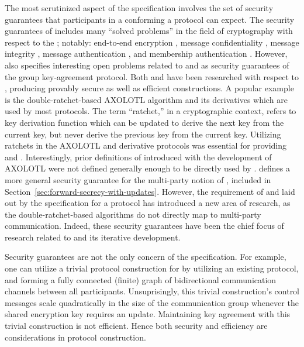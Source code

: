 The most scrutinized aspect of the  specification involves the set of security guarantees that participants in a conforming a protocol can expect.
The security guarantees of  includes many ``solved problems'' in the field of cryptography with respect to the ; notably: end-to-end encryption \autocite{padlipsky1978limitations}, message confidentiality \autocite{17715}, message integrity \autocite{voydock1983security}, message authentication \autocite{jueneman1983message}, and membership authentication \autocite{chaum1985showing}.
However,  also specifies interesting open problems related to  \autocite{gunther1989identity} and  \autocite{cohn2016post} as security guarantees of the group key-agreement protocol.
Both  and  have been researched with respect to , producing provably secure as well as efficient constructions.
A popular example is the double-ratchet-based AXOLOTL algorithm \autocite{perrin2014axolotl} and its derivatives which are used by most  protocols.
The term ``ratchet,'' in a cryptographic context, refers to key derivation function which can be updated to derive the next key from the current key, but never derive the previous key from the current key.
Utilizing ratchets in the AXOLOTL and derivative protocols was essential for providing  and .
Interestingly, prior definitions of  introduced with the development of AXOLOTL were not defined generally enough to be directly used by .
 defines a more general security guarantee for the multi-party notion of , included in Section\ \ref{sec:forward-secrecy-with-updates}.
However, the requirement of  and  laid out by the  specification for a  protocol has introduced a new area of research, as the double-ratchet-based algorithms do not directly map to multi-party communication.
Indeed, these  security guarantees have been the chief focus of research related to  and its iterative development.

Security guarantees are not the only concern of the  specification.
For example, one can utilize a trivial protocol construction for  by utilizing an existing  protocol, and forming a fully connected (finite) graph of bidirectional  communication channels between all  participants.
Unsuprisingly, this trivial construction's control messages scale quadratically in the size of the communication group whenever the shared encryption key requires an update.
Maintaining key agreement with this trivial construction is not efficient.
Hence both security and efficiency are considerations in protocol construction.

